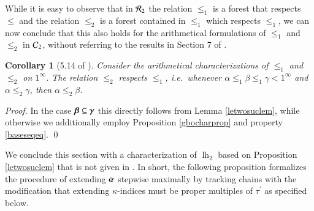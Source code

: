 \documentclass[3p,10pt,times]{elsarticle}
\newcommand{\al}{\alpha}
\newcommand{\alvec}{{\vec{\al}}}
\newcommand{\be}{\beta}
\newcommand{\bevec}{{\vec{\be}}}
\newcommand{\ga}{\gamma}
\newcommand{\gavec}{{\vec{\ga}}}
\newcommand{\ka}{\kappa}
\newcommand{\taupr}{{\tau^\prime}}
\newcommand{\leo}{\le_1}
\newcommand{\lh}{{\operatorname{lh}}}
\newcommand{\Rtwo}{{{\cal R}_2}}
\newcommand{\Ctwo}{{{\cal C}_2}}
\newtheorem{cor}[theo]{Corollary}
\newcommand{\oneinf}{1^\infty}
\newcommand{\letwo}{\le_2}
\def\vec#1{\mathchoice{\mbox{\boldmath$\displaystyle#1$}}
{\mbox{\boldmath$\textstyle#1$}}
{\mbox{\boldmath$\scriptstyle#1$}}
{\mbox{\boldmath$\scriptscriptstyle#1$}}}
\begin{document}
While it is easy to observe that in $\Rtwo$ the relation $\leo$ is a forest that respects $\le$ and the relation $\letwo$ is a forest contained in $\leo$
which respects $\leo$, we can now conclude that this also holds for the arithmetical formulations of $\leo$ and $\letwo$ in $\Ctwo$, 
without referring to the results in Section 7 of \cite{CWc}.  

\begin{cor}[5.14 of \cite{W}] Consider the arithmetical characterizations of $\leo$ and $\letwo$ on $\oneinf$.
The relation $\letwo$ respects $\leo$, i.e.\ whenever $\al\leo\be\leo\ga<\oneinf$ and $\al\letwo\ga$, then $\al\letwo\be$.
\end{cor}
\begin{proof} In the case $\bevec\subseteq\gavec$ this directly follows from Lemma \ref{letwosuclem}, 
while otherwise we additionally employ Proposition \ref{gbocharprop} and property \ref{baseseqeq}.
\qed \end{proof}

We conclude this section with a characterization of $\lh_2$ based on Proposition \ref{letwosuclem} that is not given in \cite{W}.
In short, the following proposition formalizes the procedure of extending $\alvec$ stepwise maximally by tracking chains with the 
modification that extending $\ka$-indices must be proper multiples of $\taupr$ as specified below. 
\end{document}
